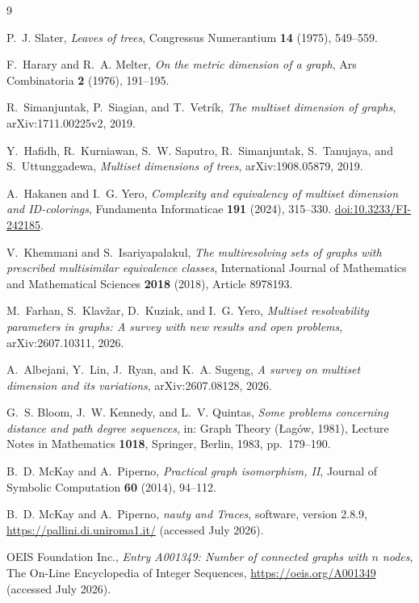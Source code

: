 \documentclass[11pt]{amsart}
\theoremstyle{remark}
\begin{document}
\begin{thebibliography}{9}

P.~J. Slater,
\emph{Leaves of trees},
Congressus Numerantium \textbf{14} (1975), 549--559.

F.~Harary and R.~A. Melter,
\emph{On the metric dimension of a graph},
Ars Combinatoria \textbf{2} (1976), 191--195.

R.~Simanjuntak, P.~Siagian, and T.~Vetr\'ik,
\emph{The multiset dimension of graphs},
arXiv:1711.00225v2, 2019.

Y.~Hafidh, R.~Kurniawan, S.~W. Saputro, R.~Simanjuntak, S.~Tanujaya, and S.~Uttunggadewa,
\emph{Multiset dimensions of trees},
arXiv:1908.05879, 2019.

A.~Hakanen and I.~G. Yero,
\emph{Complexity and equivalency of multiset dimension and ID-colorings},
Fundamenta Informaticae \textbf{191} (2024), 315--330.
\href{https://doi.org/10.3233/FI-242185}{doi:10.3233/FI-242185}.

V.~Khemmani and S.~Isariyapalakul,
\emph{The multiresolving sets of graphs with prescribed multisimilar equivalence classes},
International Journal of Mathematics and Mathematical Sciences \textbf{2018} (2018), Article 8978193.

M.~Farhan, S.~Klav\v{z}ar, D.~Kuziak, and I.~G. Yero,
\emph{Multiset resolvability parameters in graphs: A survey with new results and open problems},
arXiv:2607.10311, 2026.

A.~Albejani, Y.~Lin, J.~Ryan, and K.~A. Sugeng,
\emph{A survey on multiset dimension and its variations},
arXiv:2607.08128, 2026.

G.~S. Bloom, J.~W. Kennedy, and L.~V. Quintas,
\emph{Some problems concerning distance and path degree sequences},
in: Graph Theory (\L ag\'ow, 1981), Lecture Notes in Mathematics \textbf{1018}, Springer, Berlin, 1983, pp.~179--190.

B.~D. McKay and A.~Piperno,
\emph{Practical graph isomorphism, II},
Journal of Symbolic Computation \textbf{60} (2014), 94--112.

B.~D. McKay and A.~Piperno,
\emph{nauty and Traces}, software, version 2.8.9,
\url{https://pallini.di.uniroma1.it/} (accessed July 2026).

OEIS Foundation Inc.,
\emph{Entry A001349: Number of connected graphs with $n$ nodes},
The On-Line Encyclopedia of Integer Sequences,
\url{https://oeis.org/A001349} (accessed July 2026).

\end{thebibliography}
\end{document}
